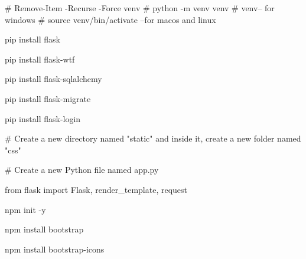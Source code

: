 # Remove-Item -Recurse -Force venv
# python -m venv venv  
# venv\Scripts\activate -- for windows
# source venv/bin/activate --for macos and linux

pip install flask

pip install flask-wtf

pip install flask-sqlalchemy

pip install flask-migrate

pip install flask-login

# Create a new directory named "static" and inside it, create a new folder named "css"

# Create a new Python file named app.py

from flask import Flask, render_template, request 


npm init -y

npm install bootstrap

npm install bootstrap-icons